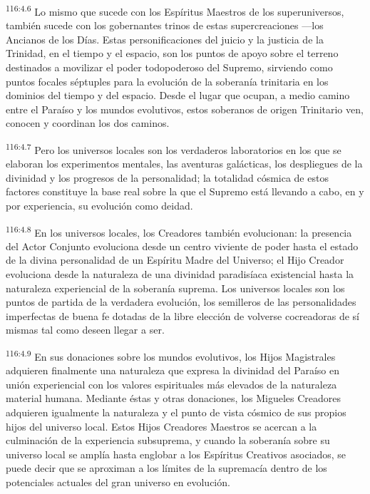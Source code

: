 \documentclass[twoside, 11pt]{book}
\begin{document}
\par
\textsuperscript{116:4.6} Lo mismo que sucede con los Espíritus Maestros de los superuniversos, también sucede con los gobernantes trinos de estas supercreaciones ---los Ancianos de los Días. Estas personificaciones del juicio y la justicia de la Trinidad, en el tiempo y el espacio, son los puntos de apoyo sobre el terreno destinados a movilizar el poder todopoderoso del Supremo, sirviendo como puntos focales séptuples para la evolución de la soberanía trinitaria en los dominios del tiempo y del espacio. Desde el lugar que ocupan, a medio camino entre el Paraíso y los mundos evolutivos, estos soberanos de origen Trinitario ven, conocen y coordinan los dos caminos.

\par
\textsuperscript{116:4.7} Pero los universos locales son los verdaderos laboratorios en los que se elaboran los experimentos mentales, las aventuras galácticas, los despliegues de la divinidad y los progresos de la personalidad; la totalidad cósmica de estos factores constituye la base real sobre la que el Supremo está llevando a cabo, en y por experiencia, su evolución como deidad.

\par
\textsuperscript{116:4.8} En los universos locales, los Creadores también evolucionan: la presencia del Actor Conjunto evoluciona desde un centro viviente de poder hasta el estado de la divina personalidad de un Espíritu Madre del Universo; el Hijo Creador evoluciona desde la naturaleza de una divinidad paradisíaca existencial hasta la naturaleza experiencial de la soberanía suprema. Los universos locales son los puntos de partida de la verdadera evolución, los semilleros de las personalidades imperfectas de buena fe dotadas de la libre elección de volverse cocreadoras de sí mismas tal como deseen llegar a ser.

\par
\textsuperscript{116:4.9} En sus donaciones sobre los mundos evolutivos, los Hijos Magistrales adquieren finalmente una naturaleza que expresa la divinidad del Paraíso en unión experiencial con los valores espirituales más elevados de la naturaleza material humana. Mediante éstas y otras donaciones, los Migueles Creadores adquieren igualmente la naturaleza y el punto de vista cósmico de sus propios hijos del universo local. Estos Hijos Creadores Maestros se acercan a la culminación de la experiencia subsuprema, y cuando la soberanía sobre su universo local se amplía hasta englobar a los Espíritus Creativos asociados, se puede decir que se aproximan a los límites de la supremacía dentro de los potenciales actuales del gran universo en evolución.
\end{document}
